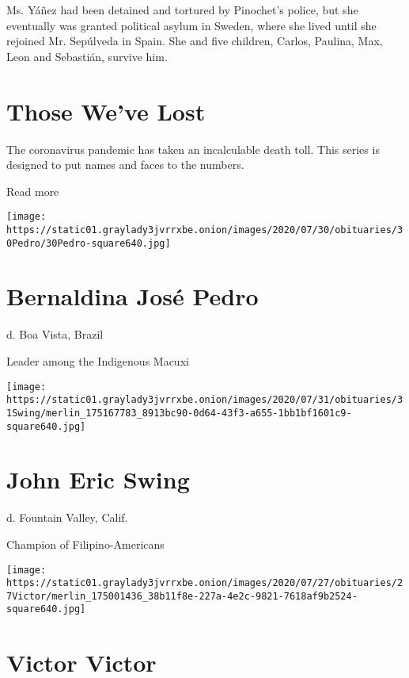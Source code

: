 Ms. Yáñez had been detained and tortured by Pinochet's police, but she
eventually was granted political asylum in Sweden, where she lived until
she rejoined Mr. Sepúlveda in Spain. She and five children, Carlos,
Paulina, Max, Leon and Sebastián, survive him.

\href{https://www.nytimes3xbfgragh.onion/interactive/2020/obituaries/people-died-coronavirus-obituaries.html?action=click\&pgtype=Article\&state=default\&region=BELOW_MAIN_CONTENT\&context=covid_obits_promo}{}

\hypertarget{those-weve-lost}{%
\section{Those We've Lost}\label{those-weve-lost}}

The coronavirus pandemic has taken an incalculable death toll. This
series is designed to put names and faces to the numbers.

Read more

\texttt{[image: https://static01.graylady3jvrrxbe.onion/images/2020/07/30/obituaries/30Pedro/30Pedro-square640.jpg]}

\hypertarget{bernaldina-josuxe9-pedro}{%
\section{Bernaldina José Pedro}\label{bernaldina-josuxe9-pedro}}

d. Boa Vista, Brazil

Leader among the Indigenous Macuxi

\texttt{[image: https://static01.graylady3jvrrxbe.onion/images/2020/07/31/obituaries/31Swing/merlin\_175167783\_8913bc90-0d64-43f3-a655-1bb1bf1601c9-square640.jpg]}

\hypertarget{john-eric-swing}{%
\section{John Eric Swing}\label{john-eric-swing}}

d. Fountain Valley, Calif.

Champion of Filipino-Americans

\texttt{[image: https://static01.graylady3jvrrxbe.onion/images/2020/07/27/obituaries/27Victor/merlin\_175001436\_38b11f8e-227a-4e2c-9821-7618af9b2524-square640.jpg]}

\hypertarget{victor-victor}{%
\section{Victor Victor}\label{victor-victor}}

